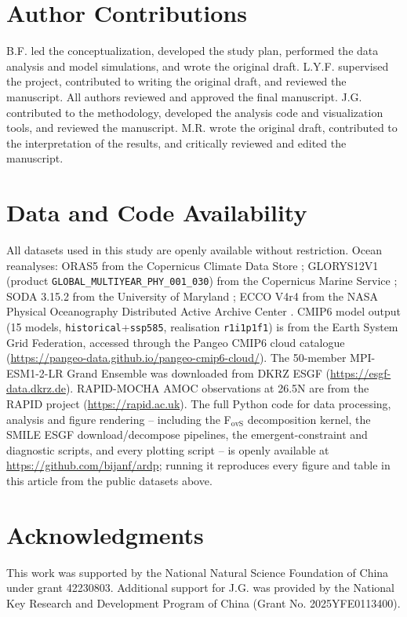 \documentclass[11pt,a4paper]{article}
\begin{document}
\section*{Author Contributions}
B.F. led the conceptualization, developed the study plan, performed the data analysis and model simulations, and wrote the original draft.
 L.Y.F. supervised the project, contributed to writing the original draft, and reviewed the manuscript. All authors reviewed and approved the final manuscript.
J.G. contributed to the methodology, developed the analysis code and visualization tools, and reviewed the manuscript.  M.R. wrote the original draft, contributed to the interpretation of the results, and critically reviewed and edited the manuscript.

\section*{Data and Code Availability}
All datasets used in this study are openly available without restriction.
Ocean reanalyses: ORAS5 from the Copernicus Climate Data Store
\citep{Zuo2019}; GLORYS12V1 (product
\texttt{GLOBAL\_MULTIYEAR\_PHY\_001\_030}) from the Copernicus Marine
Service \citep{Lellouche2021}; SODA 3.15.2 from the University of
Maryland \citep{Carton2018}; ECCO V4r4 from the NASA Physical
Oceanography Distributed Active Archive Center \citep{Forget2015}.
CMIP6 model output (15 models, \texttt{historical}+\texttt{ssp585},
realisation \texttt{r1i1p1f1}) is from the Earth System Grid Federation,
accessed through the Pangeo CMIP6 cloud catalogue
(\url{https://pangeo-data.github.io/pangeo-cmip6-cloud/}). The 50-member
MPI-ESM1-2-LR Grand Ensemble was downloaded from DKRZ ESGF
(\url{https://esgf-data.dkrz.de}). RAPID-MOCHA AMOC observations at
26.5\textdegree N are from the RAPID project (\url{https://rapid.ac.uk}).
The full Python code for data processing, analysis and figure rendering
-- including the F$_{\mathrm{ovS}}$ decomposition kernel, the SMILE
ESGF download/decompose pipelines, the emergent-constraint and
diagnostic scripts, and every plotting script -- is openly available at
\url{https://github.com/bijanf/ardp}; running it reproduces every figure
and table in this article from the public datasets above.

\section*{Acknowledgments}
This work was supported by the National Natural Science Foundation of China under grant 42230803. Additional support for J.G. was provided by the National Key Research and Development Program of China (Grant No. 2025YFE0113400).



\end{document}
